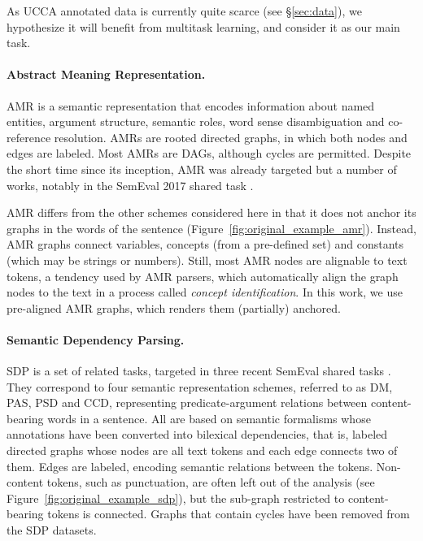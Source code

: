 \documentclass[11pt,a4paper]{article}
\begin{document}
As UCCA annotated data is currently quite scarce (see \S\ref{sec:data}), 
we hypothesize it will benefit from multitask learning, and consider it as our
main task.

\paragraph{Abstract Meaning Representation.}\label{sec:amr}

AMR \cite{banarescu2013abstract}
is a semantic representation that encodes information about named entities, 
argument structure, semantic roles, word sense disambiguation and co-reference resolution.
AMRs are rooted directed graphs, in which both nodes and edges are labeled.
Most AMRs are DAGs, although cycles are permitted.
Despite the short time since its inception, AMR was already targeted but a number of works,
notably in the SemEval 2017 shared task \cite{may2017semeval}.

AMR differs from the other schemes considered here in that it does not anchor its graphs
in the words of the sentence (Figure~\ref{fig:original_example_amr}). Instead, AMR graphs
connect variables, concepts (from a pre-defined set) and constants (which may be strings or numbers).
Still, most AMR nodes are alignable to text tokens, a tendency used by AMR parsers,
which automatically align the graph nodes to the text in a process called \textit{concept identification}.
In this work, we use pre-aligned AMR graphs, which renders them (partially) anchored.


\paragraph{Semantic Dependency Parsing.}\label{sec:sdp}

SDP is a set of related tasks, targeted in three recent SemEval shared tasks 
\cite{oepen2014semeval,oepen2015semeval,oepen2016towards}.
They correspond to four semantic representation schemes, referred to as
DM, PAS, PSD and CCD, representing
predicate-argument relations between content-bearing words in a sentence.
All are based on semantic formalisms whose annotations have been
converted into bilexical dependencies, that is,
labeled directed graphs whose nodes are all text tokens and each edge connects two of them.
Edges are labeled, encoding semantic relations between the tokens.
Non-content tokens, such as punctuation,
are often left out of the analysis (see Figure~\ref{fig:original_example_sdp}),
but the sub-graph restricted to content-bearing tokens is connected.
Graphs that contain cycles have been removed from the SDP datasets.
\end{document}
